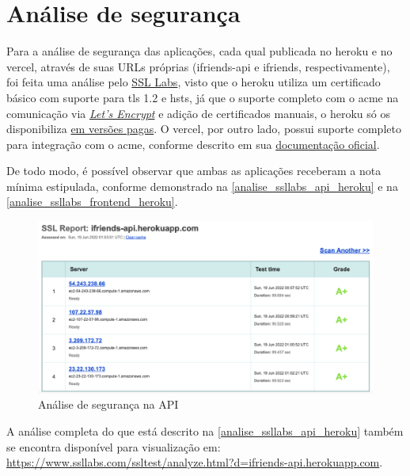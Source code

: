\section{Análise de segurança}
Para a análise de segurança das aplicações, cada qual publicada no \gls{heroku} e no \gls{vercel}, através de suas URLs próprias (ifriends-api e ifriends, respectivamente), foi feita uma análise pelo \href{https://www.ssllabs.com/}{SSL Labs}, visto que o \gls{heroku} utiliza um certificado básico com suporte para \acs{tls} 1.2 e \acs{hsts}, já que o suporte completo com o \acs{acme} na comunicação via \href{https://letsencrypt.org/getting-started/}{\textsl{Let's Encrypt}} e adição de certificados manuais, o \gls{heroku} só os disponibiliza \href{https://devcenter.heroku.com/articles/ssl}{ em versões pagas}. O \acs{vercel}, por outro lado, possui suporte completo para integração com o \acs{acme}, conforme descrito em sua \href{https://vercel.com/blog/automatic-ssl-with-vercel-lets-encrypt}{documentação oficial}.

De todo modo, é possível observar que ambas as aplicações receberam a nota mínima estipulada, conforme demonstrado na \autoref{analise_ssllabs_api_heroku} e na \autoref{analise_ssllabs_frontend_heroku}.

\begin{figure}[htb]
\centering
\caption{\label{analise_ssllabs_api_heroku} Análise de segurança na API}
\includegraphics[width=1\textwidth]{anexos/Imagens_Seguranca/analise_ssllabs_api_heroku.png}
\end{figure}
\FloatBarrier
A análise completa do que está descrito na \autoref{analise_ssllabs_api_heroku} também se encontra disponível para visualização em:  \href{https://www.ssllabs.com/ssltest/analyze.html?d=ifriends-api.herokuapp.com}{https://www.ssllabs.com/ssltest/analyze.html?d=ifriends-api.herokuapp.com}.


